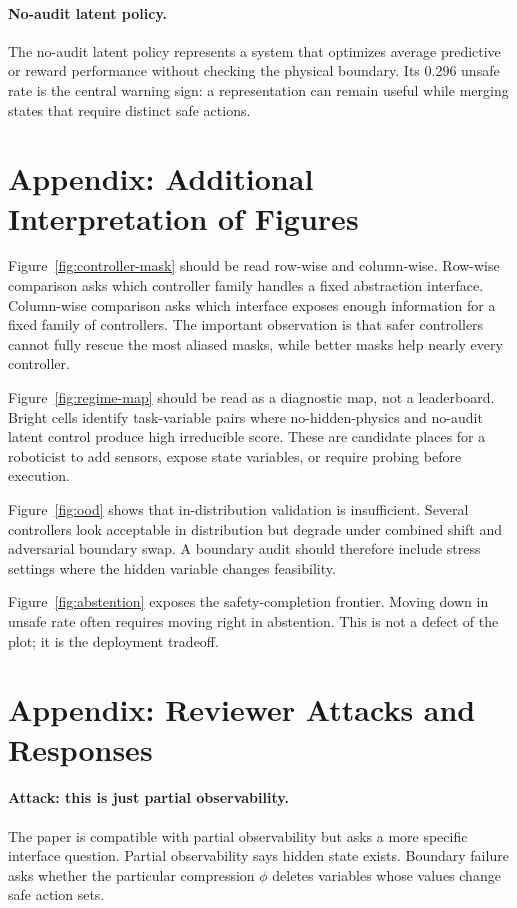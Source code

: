 \documentclass{article}
\begin{document}
\paragraph{No-audit latent policy.}
The no-audit latent policy represents a system that optimizes average predictive
or reward performance without checking the physical boundary. Its 0.296 unsafe
rate is the central warning sign: a representation can remain useful while
merging states that require distinct safe actions.

\section{Appendix: Additional Interpretation of Figures}

Figure~\ref{fig:controller-mask} should be read row-wise and column-wise. Row-wise
comparison asks which controller family handles a fixed abstraction interface.
Column-wise comparison asks which interface exposes enough information for a
fixed family of controllers. The important observation is that safer controllers
cannot fully rescue the most aliased masks, while better masks help nearly every
controller.

Figure~\ref{fig:regime-map} should be read as a diagnostic map, not a leaderboard.
Bright cells identify task-variable pairs where no-hidden-physics and no-audit
latent control produce high irreducible score. These are candidate places for a
roboticist to add sensors, expose state variables, or require probing before
execution.

Figure~\ref{fig:ood} shows that in-distribution validation is insufficient.
Several controllers look acceptable in distribution but degrade under combined
shift and adversarial boundary swap. A boundary audit should therefore include
stress settings where the hidden variable changes feasibility.

Figure~\ref{fig:abstention} exposes the safety-completion frontier. Moving down
in unsafe rate often requires moving right in abstention. This is not a defect of
the plot; it is the deployment tradeoff.

\section{Appendix: Reviewer Attacks and Responses}

\paragraph{Attack: this is just partial observability.}
The paper is compatible with partial observability but asks a more specific
interface question. Partial observability says hidden state exists. Boundary
failure asks whether the particular compression $\phi$ deletes variables whose
values change safe action sets.
\end{document}
